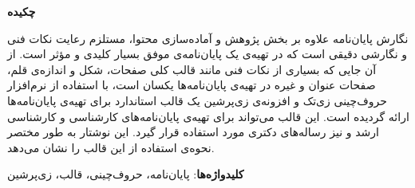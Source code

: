 


\begin{center}
\textbf{چکیده}
\end{center}
\noindent

نگارش پایان‌نامه‌ علاوه بر بخش پژوهش و آماده‌سازی محتوا،
مستلزم رعایت نکات فنی و نگارشی دقیقی است 
که در تهیه‌ی یک پایان‌نامه‌ی موفق بسیار کلیدی و مؤثر است.
از آن جایی که بسیاری از نکات فنی مانند قالب کلی صفحات، شکل و اندازه‌ی قلم، 
صفحات عنوان و غیره در تهیه‌ی پایان‌نامه‌ها یکسان است،
با استفاده از نرم‌افزار حروف‌چینی زی‌تک %
و افزونه‌ی زی‌پرشین %
یک قالب استاندارد برای تهیه‌ی پایان‌نامه‌ها ارائه گردیده است.
این قالب می‌تواند برای تهیه‌ی پایان‌نامه‌های
کارشناسی و کارشناسی ارشد و نیز رساله‌ها‌ی دکتری مورد استفاده قرار گیرد.
این نوشتار به طور مختصر نحوه‌ی استفاده از این قالب را نشان می‌دهد.

\bigskip
\noindent \textbf{کلیدواژه‌ها}: 
پایان‌نامه، حروف‌چینی، قالب، زی‌پرشین
\newpage

